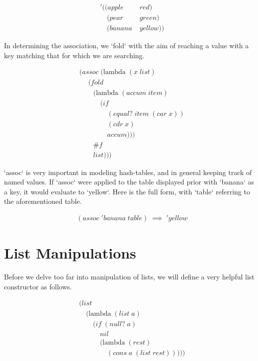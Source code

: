 \begin{align*}
& '((apple \; &red)
\\& \quad (pear \; &green)
\\& \quad (banana \; &yellow))
\end{align*}

In determining the association, we `fold` with the aim of reaching a value with a 
key matching that for which we are searching.

\begin{align*}
& (assoc \; (\text{lambda} \; (x \; list)
\\& \quad \; (fold \; 
\\& \qquad (\text{lambda} \; (accum \; item) \; 
\\& \qquad \quad (if \; 
\\& \qquad \qquad (equal? \; item \; (car \; x))
\\& \qquad \qquad (cdr \; x)
\\& \qquad \qquad accum)))
\\& \qquad \#f
\\& \qquad list)))
\end{align*}

`assoc` is very important in modeling hash-tables, and in general keeping track of 
named values. If `assoc` were applied to the table displayed prior with `banana` 
as a key, it would evaluate to `yellow`. Here is the full form, with `table` 
referring to the aforementioned table.

\begin{align*}
& (assoc \; 'banana \; table) \; \implies \; 'yellow
\end{align*}

\section{List Manipulations}
Before we delve too far into manipulation of lists, we will define a very helpful 
list constructor as follows.

\begin{align*}
& (list \; 
\\& \quad (\text{lambda} \; (list \; a) \; 
\\& \qquad (if \; (null? \; a)
\\& \qquad \quad nil
\\& \qquad \quad (\text{lambda} \; (rest)
\\& \qquad \qquad (cons \; a \; (list \; rest)))))
\end{align*}

